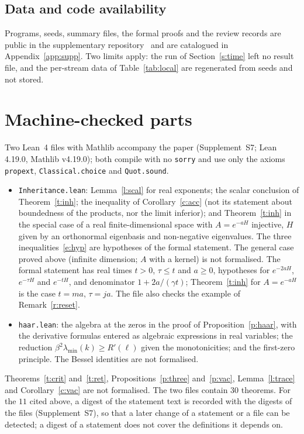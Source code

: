\subsection*{Data and code availability}
Programs, seeds, summary files, the formal proofs and the review records are public in the supplementary
repository~\cite{Supp} and are catalogued in Appendix~\ref{app:supp}. Two limits apply: the run of
Section~\ref{s:time} left no result file, and the per-stream data of Table~\ref{tab:local} are regenerated
from seeds and not stored.

\appendix
\section{Machine-checked parts}\label{s:lean}
Two Lean~4 files with Mathlib accompany the paper (Supplement~S7; Lean 4.19.0, Mathlib v4.19.0); both compile with no \texttt{sorry} and use
only the axioms \texttt{propext}, \texttt{Classical.choice} and \texttt{Quot.sound}.
\begin{itemize}
\item \texttt{Inheritance.lean}: Lemma~\ref{l:scal} for real exponents; the scalar conclusion of
Theorem~\ref{t:inh}; the inequality of Corollary~\ref{c:acc} (not its statement about boundedness of the
products, nor the limit inferior); and Theorem~\ref{t:inh} in the special case of a real finite-dimensional
space with $A=e^{-aH}$ injective, $H$ given by an orthonormal eigenbasis and non-negative eigenvalues. The
three inequalities~\eqref{e:hyp} are hypotheses of the formal statement. The general case proved above
(infinite dimension; $A$ with a kernel) is not formalised. The formal statement has real times $t>0$,
$\tau\le t$ and $a\ge0$, hypotheses for $e^{-2aH}$, $e^{-\tau H}$ and $e^{-tH}$, and denominator
$1+2a/(\gamma t)$; Theorem~\ref{t:inh} for $A=e^{-aH}$ is the case $t=ma$, $\tau=ja$. The file also checks the
example of Remark~\ref{r:reset}.
\item \texttt{haar.lean}: the algebra at the zeros in the proof of Proposition~\ref{p:haar}, with the
derivative formulas entered as algebraic expressions in real variables; the reduction
$\beta^2\lambda_{\min}(k)\ge R'(\ell)$ given the monotonicities; and the first-zero principle. The Bessel identities are not
formalised.
\end{itemize}
Theorems~\ref{t:crit} and~\ref{t:ret}, Propositions~\ref{p:three} and~\ref{p:vac}, Lemma~\ref{l:trace} and
Corollary~\ref{c:vac} are not formalised.
The two files contain $30$ theorems. For the $11$ cited above, a digest of the statement text is recorded
with the digests of the files (Supplement~S7), so that a later change of a statement or a file can be
detected; a digest of a statement does not cover the definitions it depends on.

